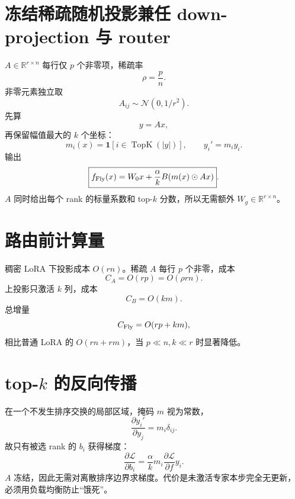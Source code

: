 \documentclass[UTF8,12pt,a4paper,fontset=none]{ctexart}
\numberwithin{equation}{section}
\newcommand{\R}{\mathbb{R}}
\newcommand{\Loss}{\mathcal{L}}
\begin{document}
\section{冻结稀疏随机投影兼任 down-projection 与 router}
$A\in\R^{r\times n}$ 每行仅 $p$ 个非零项，稀疏率
\begin{equation}
 \rho=\frac pn.
\end{equation}
非零元素独立取
\begin{equation}
 A_{ij}\sim\mathcal N(0,1/r^2).
\end{equation}
先算
\begin{equation}
 y=Ax,
\end{equation}
再保留幅值最大的 $k$ 个坐标：
\begin{equation}
 m_i(x)=\mathbf1\left[i\in\operatorname{TopK}(|y|)\right],
 \qquad y_i'=m_i y_i.
\end{equation}
输出
\begin{equation}
 \boxed{f_{\rm Fly}(x)=W_0x+\frac{\alpha}{k}B(m(x)\odot Ax)}.
\end{equation}
$A$ 同时给出每个 rank 的标量系数和 top-$k$ 分数，所以无需额外 $W_g\in\R^{r\times n}$。

\section{路由前计算量}
稠密 LoRA 下投影成本 $O(rn)$。稀疏 $A$ 每行 $p$ 个非零，成本
\begin{equation}
 C_A=O(rp)=O(\rho rn).
\end{equation}
上投影只激活 $k$ 列，成本
\begin{equation}
 C_B=O(km).
\end{equation}
总增量
\begin{equation}
 C_{\rm Fly}=O(rp+km),
\end{equation}
相比普通 LoRA 的 $O(rn+rm)$，当 $p\ll n,k\ll r$ 时显著降低。

\section{top-$k$ 的反向传播}
在一个不发生排序交换的局部区域，掩码 $m$ 视为常数，
\begin{equation}
 \frac{\partial y_i'}{\partial y_j}=m_i\delta_{ij}.
\end{equation}
故只有被选 rank 的 $b_i$ 获得梯度：
\begin{equation}
 \frac{\partial\Loss}{\partial b_i}
 =\frac{\alpha}{k}m_i\frac{\partial\Loss}{\partial f}y_i.
\end{equation}
$A$ 冻结，因此无需对离散排序边界求梯度。代价是未激活专家本步完全无更新，必须用负载均衡防止“饿死”。
\end{document}
